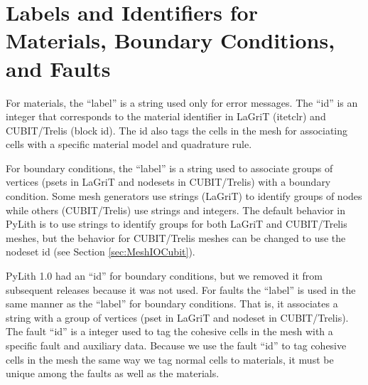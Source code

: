 \section{Labels and Identifiers for Materials, Boundary Conditions, and Faults}

For materials, the ``label'' is a string used only for error messages.
The ``id'' is an integer that corresponds to the material identifier
in LaGriT (itetclr) and CUBIT/Trelis (block id). The id also tags the
cells in the mesh for associating cells with a specific material model
and quadrature rule.

For boundary conditions, the ``label'' is a string used to associate
groups of vertices (psets in LaGriT and nodesets in CUBIT/Trelis) with
a boundary condition. Some mesh generators use strings (LaGriT) to
identify groups of nodes while others (CUBIT/Trelis) use strings and
integers. The default behavior in PyLith is to use strings to identify
groups for both LaGriT and CUBIT/Trelis meshes, but the behavior for
CUBIT/Trelis meshes can be changed to use the nodeset id (see Section
\vref{sec:MeshIOCubit}).

PyLith 1.0 had an ``id'' for boundary conditions, but we removed it
from subsequent releases because it was not used. For faults the
``label'' is used in the same manner as the ``label'' for boundary
conditions. That is, it associates a string with a group of vertices
(pset in LaGriT and nodeset in CUBIT/Trelis). The fault ``id'' is a
integer used to tag the cohesive cells in the mesh with a specific
fault and auxiliary data. Because we use the fault ``id'' to tag
cohesive cells in the mesh the same way we tag normal cells to
materials, it must be unique among the faults as well as the
materials.


